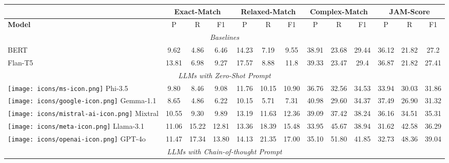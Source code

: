 \begin{table*}[h!]
\small
\centering
\renewcommand*{\arraystretch}{1}

\begin{tabular}{l|ccc|ccc|ccc|ccc}
 & \multicolumn{3}{c}{\textbf{Exact-Match}}& \multicolumn{3}{c}{\textbf{Relaxed-Match}} & \multicolumn{3}{c}{\textbf{Complex-Match}}& \multicolumn{3}{c}{\textbf{JAM-Score}} \\
\midrule
\textbf{Model}& P & R & F1 & P & R & F1  & P & R & F1 & P & R & F1\\
\midrule

\multicolumn{13}{c}{\textit{Baselines}}\\
\midrule
BERT & 9.62 & 4.86 & 6.46 & 14.23 & 7.19 & 9.55 & 38.91 & 23.68 & 29.44 & 36.12 & 21.82 & 27.2 \\

Flan-T5 & 13.81 & 6.98 & 9.27 & 17.57 & 8.88 & 11.8 & 39.33 & 23.47 & 29.4 & 36.87 & 21.82 & 27.41 \\

\midrule
\multicolumn{13}{c}{\textit{LLMs with Zero-Shot Prompt}}\\
\midrule

\texttt{[image: icons/ms-icon.png]} Phi-3.5 & 9.80 & 8.46 & 9.08 & 11.76 & 10.15 & 10.90 & 36.76 & 32.56 & 34.53 & 33.94 & 30.03 & 31.86 \\
\texttt{[image: icons/google-icon.png]} Gemma-1.1 & 8.65 & 4.86 & 6.22 & 10.15 & 5.71 & 7.31 & 40.98 & 29.60 & 34.37 & 37.49 & 26.90 & 31.32 \\
\texttt{[image: icons/mistral-ai-icon.png]} Mixtral & 10.55 & 9.30 & 9.89 & 13.19 & 11.63 & 12.36 & 39.09 & 37.42 & 38.24 & 36.16 & 34.51 & 35.31 \\
\texttt{[image: icons/meta-icon.png]} Llama-3.1 & 11.06 & 15.22 & 12.81 & 13.36 & 18.39 & 15.48 & 33.95 & 45.67 & 38.94 & 31.62 & 42.58 & 36.29 \\
\texttt{[image: icons/openai-icon.png]} GPT-4o & 11.47 & 17.34 & 13.80 & 14.13 & 21.35 & 17.00 & 35.10 & 51.80 & 41.85 & 32.73 & 48.36 & 39.04 \\

\midrule
\multicolumn{13}{c}{\textit{LLMs with Chain-of-thought Prompt}}\\
\midrule


\end{tabular}
\end{table*}
